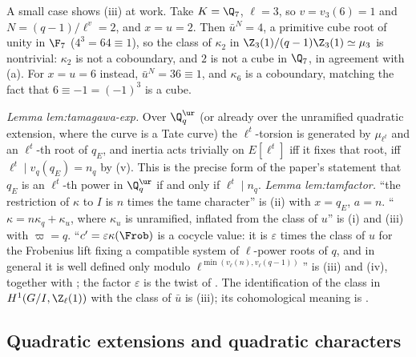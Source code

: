 A small case shows (iii) at work. Take $K=\Q_7$, $\ell=3$, so $v=v_3(6)=1$ and $N=(q-1)/\ell^v=2$, and $x=u=2$. Then $\bar u^N=4$, a primitive cube root
of unity in $\F_7$ ($4^3=64\equiv1$), so the class of $\kappa_2$ in $\Z_3(1)/(q-1)\Z_3(1)\simeq\mu_3$ is nontrivial: $\kappa_2$ is not a coboundary, and $2$ is not
a cube in $\Q_7$, in agreement with (a). For $x=u=6$ instead, $\bar u^N=36\equiv1$, and $\kappa_6$ is a coboundary, matching
the fact that $6\equiv-1=(-1)^3$ is a cube.

\begin{paperlink}\label{pl:local:kummer}
\emph{Lemma lem:tamagawa-exp.} Over $\Q_q^{\ur}$ (or already over the unramified quadratic extension, where the curve is a Tate curve) the
$\ell^t$-torsion is generated by $\mu_{\ell^t}$ and an $\ell^t$-th root of $q_E$, and inertia acts trivially on $E[\ell^t]$ iff it fixes that root, iff
$\ell^t\mid v_q(q_E)=n_q$ by (v). This is the precise form of the paper's statement that $q_E$ is an $\ell^t$-th power in $\Q_q^{\ur}$ if and only if
$\ell^t\mid n_q$. \emph{Lemma lem:tamfactor.} ``the restriction of $\kappa$ to $I$ is $n$ times the tame character'' is
(ii) with $x=q_E$, $a=n$. ``$\kappa=n\kappa_q+\kappa_u$, where $\kappa_u$ is unramified, inflated from the class of $u$'' is (i) and
(iii) with $\varpi=q$. ``$c'=\varepsilon\kappa(\Frob)$ is a cocycle value: it is $\varepsilon$ times the class of $u$ for the Frobenius lift fixing a compatible system of
$\ell$-power roots of $q$, and in general it is well defined only modulo $\ell^{\min(v_\ell(n),v_\ell(q-1))}$'' is (iii) and (iv), together with
; the factor $\varepsilon$ is the twist of . The identification of the class in
$H^1(G/I,\Z_\ell(1))$ with the class of $\bar u$ is (iii); its cohomological meaning is .
\end{paperlink}

\subsection{Quadratic extensions and quadratic characters}


